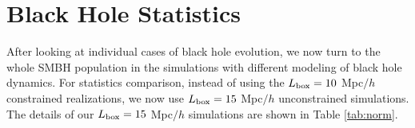 \section{Black Hole Statistics}
\label{sec:stats}
After looking at individual cases of black hole evolution, we now turn to the whole SMBH population in the simulations with different modeling of black hole dynamics. For statistics comparison, instead of using the $L_{\rm box} = 10$ Mpc$/h$ constrained realizations, we now use $L_{\rm box} = 15$ Mpc$/h$ unconstrained simulations. The details of our $L_{\rm box} = 15$ Mpc$/h$ simulations are shown in Table \ref{tab:norm}.



